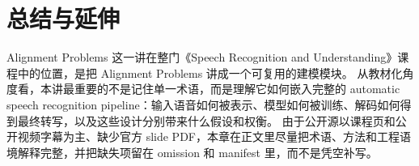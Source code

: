 \documentclass[a4paper]{article}
\begin{document}
\section{总结与延伸}
Alignment Problems 这一讲在整门《Speech Recognition and Understanding》课程中的位置，是把 Alignment Problems 讲成一个可复用的建模模块。
从教材化角度看，本讲最重要的不是记住单一术语，而是理解它如何嵌入完整的 automatic speech recognition pipeline：输入语音如何被表示、模型如何被训练、解码如何得到最终转写，以及这些设计分别带来什么假设和权衡。
由于公开源以课程页和公开视频字幕为主、缺少官方 slide PDF，本章在正文里尽量把术语、方法和工程语境解释完整，并把缺失项留在 omission 和 manifest 里，而不是凭空补写。
\end{document}
